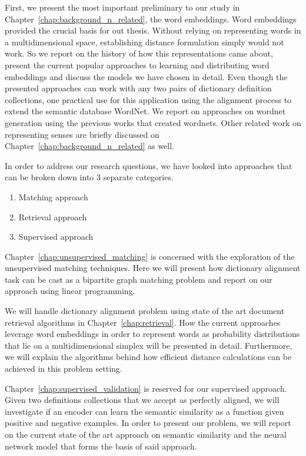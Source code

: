 First, we present the most important preliminary to our study in Chapter~\ref{chap:background_n_related}, the word embeddings.
Word embeddings provided the crucial basis for out thesis.
Without relying on representing words in a multidimensional space, establishing distance formulation simply would not work.
So we report on the history of how this representations came about, present the current popular approaches to learning and distributing word embeddings and discuss the models we have chosen in detail.
Even though the presented approaches can work with any two pairs of dictionary definition collections, one practical use for this application using the alignment process to extend the semantic database WordNet.
We report on approaches on wordnet generation using the previous works that created wordnets.
Other related work on representing senses are briefly discussed on Chapter~\ref{chap:background_n_related} as well.

In order to address our research questions, we have looked into approaches that can be broken down into 3 separate categories.
\begin{enumerate}
    \item Matching approach
    \item Retrieval approach
    \item Supervised approach
\end{enumerate}

Chapter~\ref{chap:unsupervised_matching} is concerned with the exploration of the unsupervised matching techniques.
Here we will present how dictionary alignment task can be cast as a bipartite graph matching problem and report on our approach using linear programming.

We will handle dictionary alignment problem using state of the art document retrieval algorithms in Chapter~\ref{chap:retrieval}.
How the current approaches leverage word embeddings in order to represent words as probability distributions that lie on a multidimensional simplex will be presented in detail.
Furthermore, we will explain the algorithms behind how efficient distance calculations can be achieved in this problem setting.

Chapter~\ref{chap:supervised_validation} is reserved for our supervised approach.
Given two definitions collections that we accept as perfectly aligned, we will investigate if an encoder can learn the semantic similarity as a function given positive and negative examples.
In order to present our problem, we will report on the current state of the art approach on semantic similarity and the neural network model that forms the basis of said approach.

